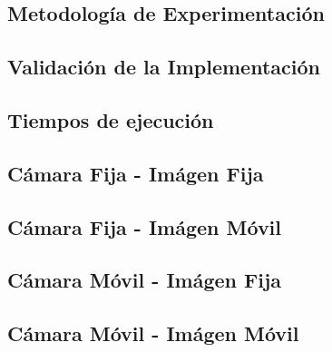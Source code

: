 \subsection{Metodolog\'ia de Experimentaci\'on}\label{subsec:metodologia}


\newpage
\subsection{Validaci\'on de la Implementaci\'on}


\newpage
\subsection{Tiempos de ejecuci\'on}


\newpage
\subsection{C\'amara Fija - Im\'agen Fija}\label{subsec:fija-fija}


\newpage
\subsection{C\'amara Fija - Im\'agen M\'ovil}


\newpage
\subsection{C\'amara M\'ovil - Im\'agen Fija}\label{subsec:movil-fija}


\newpage
\subsection{C\'amara M\'ovil - Im\'agen M\'ovil}



